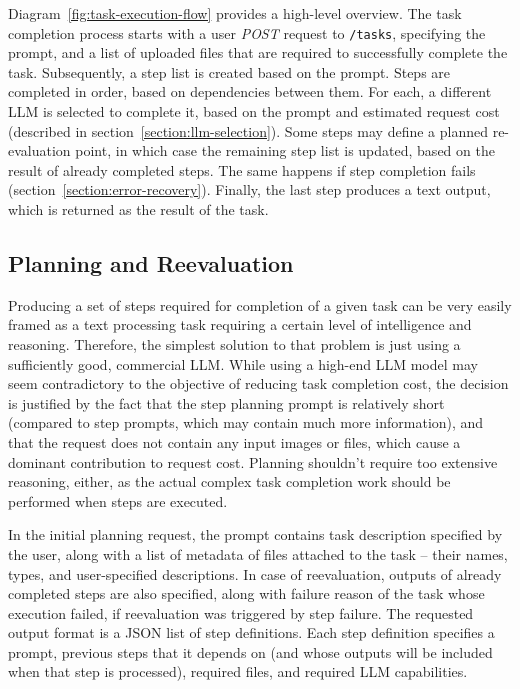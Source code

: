 \documentclass[a4paper,11pt,twoside]{report}
\theoremstyle{definition}
\begin{document}
Diagram~\ref{fig:task-execution-flow} provides a high-level overview. The task completion process starts with a user \textit{POST} request to \texttt{/tasks}, specifying the prompt, and a list of uploaded files that are required to successfully complete the task. Subsequently, a step list is created based on the prompt. Steps are completed in order, based on dependencies between them. For each, a different LLM is selected to complete it, based on the prompt and estimated request cost (described in section~\ref{section:llm-selection}). Some steps may define a planned re-evaluation point, in which case the remaining step list is updated, based on the result of already completed steps. The same happens if step completion fails (section~\ref{section:error-recovery}). Finally, the last step produces a text output, which is returned as the result of the task.

\subsection{Planning and Reevaluation}
\label{section:planning-and-reevaluation}

Producing a set of steps required for completion of a given task can be very easily framed as a text processing task requiring a certain level of intelligence and reasoning. Therefore, the simplest solution to that problem is just using a sufficiently good, commercial LLM. While using a high-end LLM model may seem contradictory to the objective of reducing task completion cost, the decision is justified by the fact that the step planning prompt is relatively short (compared to step prompts, which may contain much more information), and that the request does not contain any input images or files, which cause a dominant contribution to request cost. Planning shouldn't require too extensive reasoning, either, as the actual complex task completion work should be performed when steps are executed.

In the initial planning request, the prompt contains task description specified by the user, along with a list of metadata of files attached to the task -- their names, types, and user-specified descriptions. In case of reevaluation, outputs of already completed steps are also specified, along with failure reason of the task whose execution failed, if reevaluation was triggered by step failure. The requested output format is a JSON list of step definitions. Each step definition specifies a prompt, previous steps that it depends on (and whose outputs will be included when that step is processed), required files, and required LLM capabilities.
\end{document}
